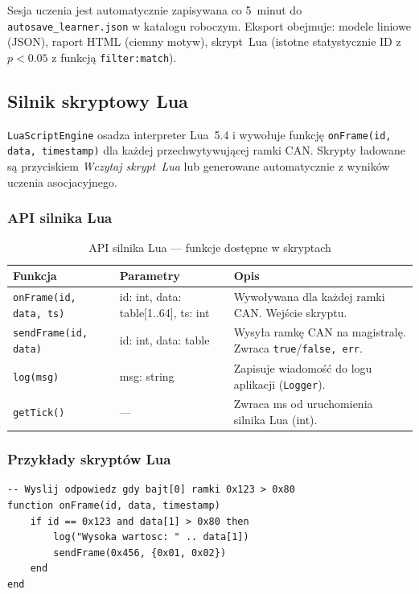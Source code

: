 \documentclass[12pt, a4paper]{article}
\begin{document}
Sesja uczenia jest automatycznie zapisywana co 5~minut do
\texttt{autosave\_learner.json} w katalogu roboczym. Eksport obejmuje:
modele liniowe (JSON), raport HTML (ciemny motyw), skrypt~Lua
(istotne statystycznie ID z $p<0.05$ z funkcją \texttt{filter:match}).

\subsection{Silnik skryptowy Lua}

\texttt{LuaScriptEngine} osadza interpreter Lua~5.4 i wywołuje funkcję
\texttt{onFrame(id, data, timestamp)} dla każdej przechwytywującej ramki CAN.
Skrypty ładowane są przyciskiem \emph{Wczytaj skrypt~Lua} lub generowane
automatycznie z wyników uczenia asocjacyjnego.

\subsubsection*{API silnika Lua}

\begin{table}[H]
\caption{API silnika Lua --- funkcje dostępne w skryptach}
\label{tab:luaapi}
\centering
\small
\begin{tabular}{p{4.5cm}p{4.0cm}p{6.2cm}}
\toprule
\textbf{Funkcja} & \textbf{Parametry} & \textbf{Opis} \\
\midrule
\texttt{onFrame(id, data, ts)} &
  id: int, data: table[1..64], ts: int &
  Wywoływana dla każdej ramki CAN. Wejście skryptu. \\
\texttt{sendFrame(id, data)} &
  id: int, data: table &
  Wysyła ramkę CAN na magistralę. Zwraca \texttt{true}/\texttt{false, err}. \\
\texttt{log(msg)} &
  msg: string &
  Zapisuje wiadomość do logu aplikacji (\texttt{Logger}). \\
\texttt{getTick()} &
  --- &
  Zwraca ms od uruchomienia silnika Lua (int). \\
\bottomrule
\end{tabular}
\end{table}

\subsubsection*{Przykłady skryptów Lua}

\begin{lstlisting}[style=cpp, caption={Monitorowanie i automatyczna odpowiedz}]
-- Wyslij odpowiedz gdy bajt[0] ramki 0x123 > 0x80
function onFrame(id, data, timestamp)
    if id == 0x123 and data[1] > 0x80 then
        log("Wysoka wartosc: " .. data[1])
        sendFrame(0x456, {0x01, 0x02})
    end
end
\end{lstlisting}
\end{document}
